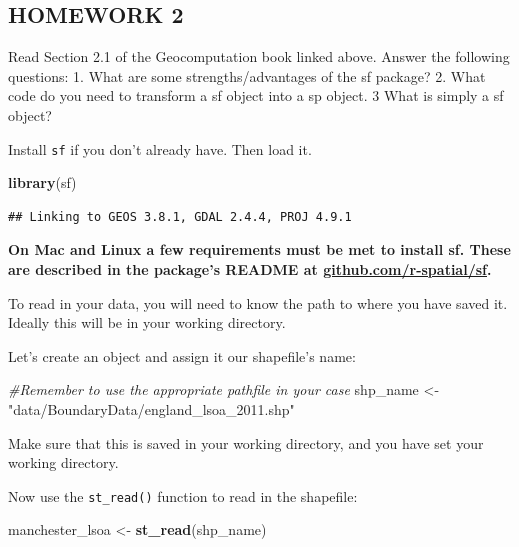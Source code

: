 \documentclass[]{book}
\newenvironment{Shaded}{\begin{snugshade}}{\end{snugshade}}
\newcommand{\CommentTok}[1]{\textcolor[rgb]{0.56,0.35,0.01}{\textit{#1}}}
\newcommand{\KeywordTok}[1]{\textcolor[rgb]{0.13,0.29,0.53}{\textbf{#1}}}
\newcommand{\NormalTok}[1]{#1}
\newcommand{\StringTok}[1]{\textcolor[rgb]{0.31,0.60,0.02}{#1}}
\begin{document}
\hypertarget{homework-2}{%
\subsection{\texorpdfstring{\textbf{HOMEWORK 2}}{HOMEWORK 2}}\label{homework-2}}

Read Section 2.1 of the Geocomputation book linked above. Answer the following questions:
1. What are some strengths/advantages of the sf package?
2. What code do you need to transform a sf object into a sp object.
3 What is simply a sf object?

Install \texttt{sf} if you don't already have. Then load it.

\begin{Shaded}
\begin{Highlighting}[]
\KeywordTok{library}\NormalTok{(sf)}
\end{Highlighting}
\end{Shaded}

\begin{verbatim}
## Linking to GEOS 3.8.1, GDAL 2.4.4, PROJ 4.9.1
\end{verbatim}

\textbf{On Mac and Linux a few requirements must be met to install sf. These are described in the package's README at \url{github.com/r-spatial/sf}.}

To read in your data, you will need to know the path to where you have saved it. Ideally this will be in your working directory.

Let's create an object and assign it our shapefile's name:

\begin{Shaded}
\begin{Highlighting}[]
\CommentTok{#Remember to use the appropriate pathfile in your case}
\NormalTok{shp_name <-}\StringTok{ "data/BoundaryData/england_lsoa_2011.shp"}
\end{Highlighting}
\end{Shaded}

Make sure that this is saved in your working directory, and you have set your working directory.

Now use the \texttt{st\_read()} function to read in the shapefile:

\begin{Shaded}
\begin{Highlighting}[]
\NormalTok{manchester_lsoa <-}\StringTok{ }\KeywordTok{st_read}\NormalTok{(shp_name)}
\end{Highlighting}
\end{Shaded}
\end{document}
